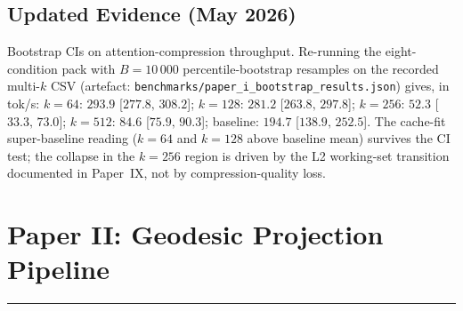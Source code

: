 \documentclass[11pt]{article}
\begin{document}
\subsection{Updated Evidence (May 2026)}
Bootstrap CIs on attention-compression throughput.
Re-running the eight-condition pack with $B{=}10\,000$ percentile-bootstrap
resamples on the recorded multi-$k$ CSV (artefact:
\texttt{benchmarks/paper\_i\_bootstrap\_results.json}) gives, in tok/s:
$k{=}64$: $293.9$ [$277.8,\,308.2$]; $k{=}128$: $281.2$ [$263.8,\,297.8$];
$k{=}256$: $52.3$ [$33.3,\,73.0$]; $k{=}512$: $84.6$ [$75.9,\,90.3$];
baseline: $194.7$ [$138.9,\,252.5$]. The cache-fit super-baseline reading
($k{=}64$ and $k{=}128$ above baseline mean) survives the CI test;
the collapse in the $k{=}256$ region is driven by the L2 working-set
transition documented in Paper~IX, not by compression-quality loss.

\newpage



\newpage
\section{Paper II: Geodesic Projection Pipeline}
\vspace{6pt}
\hrule
\vspace{12pt}

\begin{abstract}
\noindent
Paper I showed that you can compress a model's attention mechanism by keeping
only the most important directions in three weight matrices. This paper extends
the idea to the entire transformer, all seven compressible matrices
in every layer, not just the three attention ones. Each matrix gets its own
compression level based on how much structure it actually has. Some layers do
simple transformations and can be heavily compressed; others do complex work
and need more dimensions kept.

We measured the full compression profile on an 8-billion-parameter model:
every matrix in every layer was analyzed, and the results confirm that
compression is viable across the entire model. We also designed three
advanced mechanisms (adaptive gauge optimization, thermal-aware rank control,
and online basis updates) that would make the compression respond to runtime
conditions. These designs are mathematically specified but not yet built and
tested, they are explicitly labeled as future work.

Every number in this paper comes from a hardware measurement unless labeled
as a design specification or analytic prediction.
\end{abstract}
\end{document}
